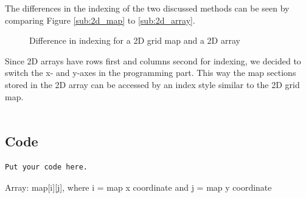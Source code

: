 The differences in the indexing of the two discussed methods can be seen by comparing Figure \ref{sub:2d_map} to \ref{sub:2d_array}.
\begin{figure}[htp]
    \centering
    \hspace{0.05\textwidth}  
    \caption{Difference in indexing for a 2D grid map and a 2D array}
    \label{fig:floor_plans}
\end{figure}

Since 2D arrays have rows first and columns second for indexing, we decided to switch the x- and y-axes in the programming part. This way the map sections stored in the 2D array can be accessed by an index style similar to the 2D grid map.
\\
\\
\subsection*{Code}\label{app:code}

\begin{lstlisting}
Put your code here.
\end{lstlisting}

Array: map[i][j], where i = map x coordinate and j = map y coordinate 

